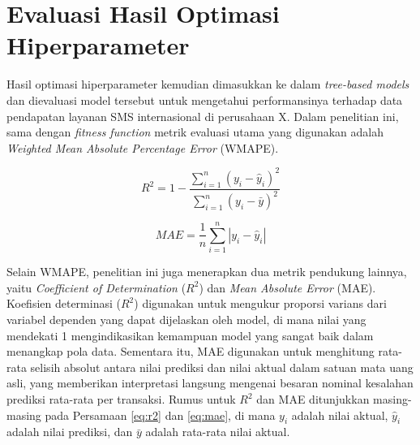     \section{Evaluasi Hasil Optimasi Hiperparameter}

    Hasil optimasi hiperparameter kemudian dimasukkan ke dalam \textit{tree-based models} dan dievaluasi model tersebut untuk mengetahui performansinya terhadap data pendapatan layanan SMS internasional di perusahaan X. Dalam penelitian ini, sama dengan \textit{fitness function} metrik evaluasi utama yang digunakan adalah \textit{Weighted Mean Absolute Percentage Error} (WMAPE). 
    
    \begin{equation} \label{eq:r2}
    R^2 = 1 - \frac{\sum_{i=1}^{n} (y_{i} - \hat{y}_{i})^2}{\sum_{i=1}^{n} (y_{i} - \bar{y})^2}
    \end{equation}
    
    \begin{equation} \label{eq:mae}
    MAE = \frac{1}{n} \sum_{i=1}^{n} |y_{i} - \hat{y}_{i}|
    \end{equation}
    
    Selain WMAPE, penelitian ini juga menerapkan dua metrik pendukung lainnya, yaitu \textit{Coefficient of Determination} ($R^2$) dan \textit{Mean Absolute Error} (MAE). Koefisien determinasi ($R^2$) digunakan untuk mengukur proporsi varians dari variabel dependen yang dapat dijelaskan oleh model, di mana nilai yang mendekati 1 mengindikasikan kemampuan model yang sangat baik dalam menangkap pola data. Sementara itu, MAE digunakan untuk menghitung rata-rata selisih absolut antara nilai prediksi dan nilai aktual dalam satuan mata uang asli, yang memberikan interpretasi langsung mengenai besaran nominal kesalahan prediksi rata-rata per transaksi. Rumus untuk $R^2$ dan MAE ditunjukkan masing-masing pada Persamaan \ref{eq:r2} dan \ref{eq:mae}, di mana $y_i$ adalah nilai aktual, $\hat{y}_i$ adalah nilai prediksi, dan $\bar{y}$ adalah rata-rata nilai aktual.
    
    